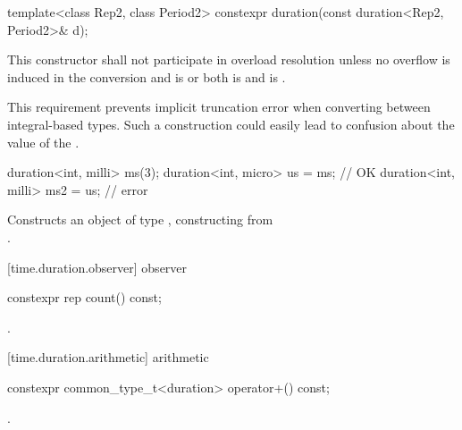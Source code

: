%
\begin{itemdecl}
template<class Rep2, class Period2>
  constexpr duration(const duration<Rep2, Period2>& d);
\end{itemdecl}

\begin{itemdescr}
\pnum
\remarks This constructor shall not participate in overload resolution unless
no overflow is induced in the conversion and
 is  or both
 is  and
 is . \begin{note} This
requirement prevents implicit truncation error when converting between
integral-based  types. Such a construction could easily lead to
confusion about the value of the . \end{note}
\begin{example}
\begin{codeblock}
duration<int, milli> ms(3);
duration<int, micro> us = ms;       // OK
duration<int, milli> ms2 = us;      // error
\end{codeblock}
\end{example}

\pnum
\effects Constructs an object of type , constructing  from\\
.
\end{itemdescr}

[time.duration.observer]{ observer}

%
\begin{itemdecl}
constexpr rep count() const;
\end{itemdecl}

\begin{itemdescr}
\pnum
\returns {}.
\end{itemdescr}

[time.duration.arithmetic]{ arithmetic}

%
\begin{itemdecl}
constexpr common_type_t<duration> operator+() const;
\end{itemdecl}

\begin{itemdescr}
\pnum
\returns {}.
\end{itemdescr}

